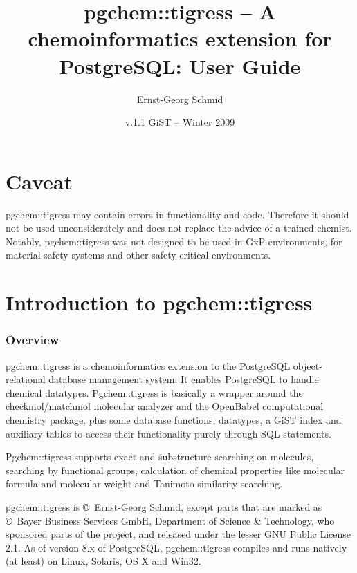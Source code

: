 \documentclass[a4paper]{article}
\begin{document}
\title{pgchem::tigress -- A chemoinformatics extension for PostgreSQL: User Guide}
\author{Ernst-Georg Schmid}
\date{v.1.1	GiST -- Winter 2009}
\maketitle%
\newpage
\tableofcontents\newpage
\part{Caveat}
pgchem::tigress may contain errors in functionality and code. Therefore it should not be used unconsiderately and does not replace the advice of a trained chemist.
Notably, pgchem::tigress was not designed to be used in GxP environments, for material safety systems and other safety critical environments.
\part{Introduction to pgchem::tigress}
\section{Overview}
pgchem::tigress is a chemoinformatics extension to the PostgreSQL object-relational database management system. It enables PostgreSQL to handle chemical datatypes. Pgchem::tigress is basically a wrapper around the checkmol/matchmol molecular analyzer and the OpenBabel computational chemistry package, plus some database functions, datatypes, a GiST index and auxiliary tables to access their functionality purely through SQL statements.\par
Pgchem::tigress supports exact and substructure searching on molecules, searching by functional groups, calculation of chemical properties like molecular formula and molecular weight and Tanimoto similarity searching.\par
pgchem::tigress is \copyright~Ernst-Georg Schmid, except parts that are marked as \copyright~Bayer Business Services GmbH, Department of Science \& Technology, who sponsored parts of the project, and released under the lesser GNU Public License 2.1.
As of version 8.x of PostgreSQL, pgchem::tigress compiles and runs natively (at least) on Linux, Solaris, OS X and Win32. 
\end{document}
